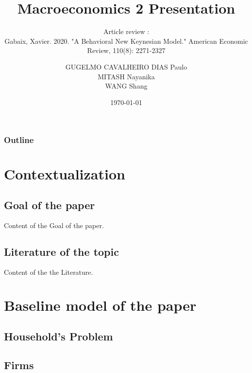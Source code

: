 \documentclass{beamer}
\title{Macroeconomics 2 Presentation}
\subtitle{Article review :\\ Gabaix, Xavier. 2020. "A Behavioral New Keynesian Model." American Economic Review, 110(8): 2271-2327}
\author{GUGELMO CAVALHEIRO DIAS Paulo \\ MITASH Nayanika \\ WANG Shang}
\institute{Sciences Po}
\date{\today}
\newcommand\ReduceFont{\fontsize{10}{7.2}\selectfont}
\begin{document}
\begin{frame}
    \titlepage
\end{frame}

\begin{frame}
    \ReduceFont
    \frametitle{Outline}
    \tableofcontents[hideallsubsections]
\end{frame}

\section{Contextualization}
\begin{frame}
    \tableofcontents[currentsection, hideothersubsections, sections=\value{section}]
\end{frame}

\subsection{Goal of the paper}
\begin{frame}{\subsecname}
    Content of the Goal of the paper.
\end{frame}

\subsection{Literature of the topic}
\begin{frame}
    Content of the the Literature.
\end{frame}

\section{Baseline model of the paper}
\begin{frame}
    \ReduceFont
\end{frame}

\begin{frame}
    \tableofcontents[currentsection, hideothersubsections, sections=\value{section}]
\end{frame}

\subsection{Household's Problem}

\subsection{Firms}
\end{document}
